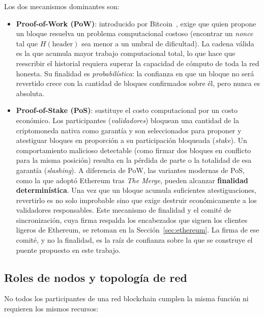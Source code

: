 Los dos mecanismos dominantes son:

\begin{itemize}
	\item \textbf{Proof-of-Work (PoW)}: introducido por Bitcoin~\cite{nakamoto2008bitcoin}, exige
	que quien propone un bloque resuelva un problema computacional costoso (encontrar un
	\textit{nonce} tal que $H(\text{header})$ sea menor a un umbral de dificultad). La cadena
	válida es la que acumula mayor trabajo computacional total, lo que hace que reescribir el
	historial requiera superar la capacidad de cómputo de toda la red honesta. Su finalidad es
	\textit{probabilística}: la confianza en que un bloque no será revertido crece con la
	cantidad de bloques confirmados sobre él, pero nunca es absoluta.

	\item \textbf{Proof-of-Stake (PoS)}: sustituye el costo computacional por un costo
	económico. Los participantes (\textit{validadores}) bloquean una cantidad de la
	criptomoneda nativa como garantía y son seleccionados para proponer y atestiguar bloques en
	proporción a su participación bloqueada (\textit{stake}). Un comportamiento malicioso
	detectable (como firmar dos bloques en conflicto para la misma posición) resulta en la
	pérdida de parte o la totalidad de esa garantía (\textit{slashing}). A diferencia de PoW,
	las variantes modernas de PoS, como la que adoptó Ethereum tras \textit{The Merge}, pueden
	alcanzar \textbf{finalidad determinística}. Una vez que un bloque acumula suficientes
	atestiguaciones, revertirlo es no solo improbable sino que exige destruir económicamente a
	los validadores responsables. Este mecanismo de finalidad y el comité de sincronización, cuya
	firma respalda los encabezados que siguen los clientes ligeros de Ethereum, se retoman en la
	Sección~\ref{sec:ethereum}. La firma de ese comité, y no la finalidad, es la raíz de confianza
	sobre la que se construye el puente propuesto en este trabajo.
\end{itemize}

\subsection{Roles de nodos y topología de red}
\label{sec:roles_nodos}

No todos los participantes de una red blockchain cumplen la misma función ni requieren los
mismos recursos:

